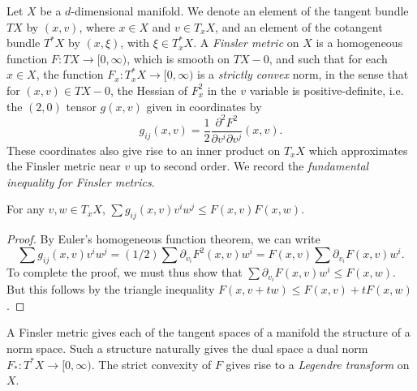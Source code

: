 Let $X$ be a $d$-dimensional manifold. We denote an element of the tangent bundle $TX$ by $(x,v)$, where $x \in X$ and $v \in T_x X$, and an element of the cotangent bundle $T^*X$ by $(x,\xi)$, with $\xi \in T_x^* X$. A \emph{Finsler metric} on $X$ is a homogeneous function $F: T X \to [0,\infty)$, which is smooth on $TX - 0$, and such that for each $x \in X$, the function $F_x: T^*_x X \to [0,\infty)$ is a \emph{strictly convex} norm, in the sense that for $(x,v) \in TX - 0$, the Hessian of $F_x^2$ in the $v$ variable is positive-definite, i.e. the $(2,0)$ tensor $g(x,v)$ given in coordinates by
%
\begin{equation} \label{FinslerMetricCoefficients}
    g_{ij}(x,v) = \frac{1}{2} \frac{\partial^2 F^2}{\partial v^i \partial v^j}(x,v).
\end{equation}
%
These coordinates also give rise to an inner product on $T_x X$ which approximates the Finsler metric near $v$ up to second order. We record the \emph{fundamental inequality for Finsler metrics}.

\begin{lemma}
  For any $v,w \in T_x X$, $\sum g_{ij}(x,v) v^i w^j \leq F(x,v) F(x,w)$.
\end{lemma}
\begin{proof}
  By Euler's homogeneous function theorem, we can write
  \begin{equation}
    \sum g_{ij}(x,v) v^i w^j = (1/2) \sum \partial_{v_i} F^2(x,v) w^i = F(x,v) \sum \partial_{v_i} F(x,v) w^i.
  \end{equation}
  To complete the proof, we must thus show that $\sum \partial_{v_i} F(x,v) w^i \leq F(x,w)$. But this follows by the triangle inequality $F(x,v + tw) \leq F(x,v) + t F(x,w)$.
\end{proof}

A Finsler metric gives each of the tangent spaces of a manifold the structure of a norm space. Such a structure naturally gives the dual space a dual norm $F_*: T^* X \to [0,\infty)$. The strict convexity of $F$ gives rise to a \emph{Legendre transform} on $X$.

